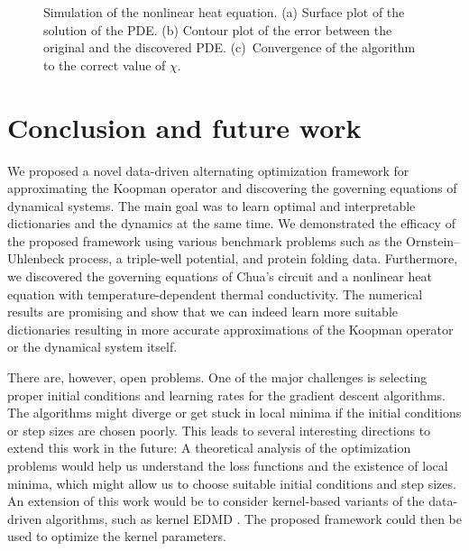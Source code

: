 \documentclass
[
    a4paper,
    DIV=11,
    abstract=true,
    11pt,
]
{scrartcl}
\theoremstyle{definition}
\begin{document}
\begin{figure}
    \centering
    \quad
    \quad
    \vspace{-0.1cm}\quad
    \caption{Simulation of the nonlinear heat equation. (a) Surface plot of the solution of the PDE. (b) Contour plot of the error between the original and the discovered PDE. (c)~Convergence of the algorithm to the correct value of $\chi$.}
    \label{fig:pde_results}
\end{figure}

\section{Conclusion and future work}
\label{sec:conclusion}

We proposed a novel data-driven alternating optimization framework for approximating the Koopman operator and discovering the governing equations of dynamical systems. The main goal was to learn optimal and interpretable dictionaries and the dynamics at the same time. We demonstrated the efficacy of the proposed framework using various benchmark problems such as the Ornstein--Uhlenbeck process, a triple-well potential, and protein folding data. Furthermore, we discovered the governing equations of Chua's circuit and a nonlinear heat equation with temperature-dependent thermal conductivity. The numerical results are promising and show that we can indeed learn more suitable dictionaries resulting in more accurate approximations of the Koopman operator or the dynamical system itself.

There are, however, open problems. One of the major challenges is selecting proper initial conditions and learning rates for the gradient descent algorithms. The algorithms might diverge or get stuck in local minima if the initial conditions or step sizes are chosen poorly. This leads to several interesting directions to extend this work in the future: A theoretical analysis of the optimization problems would help us understand the loss functions and the existence of local minima, which might allow us to choose suitable initial conditions and step sizes. An extension of this work would be to consider kernel-based variants of the data-driven algorithms, such as kernel EDMD \cite{WRK15,KSM20}. The proposed framework could then be used to optimize the kernel parameters.
\end{document}
